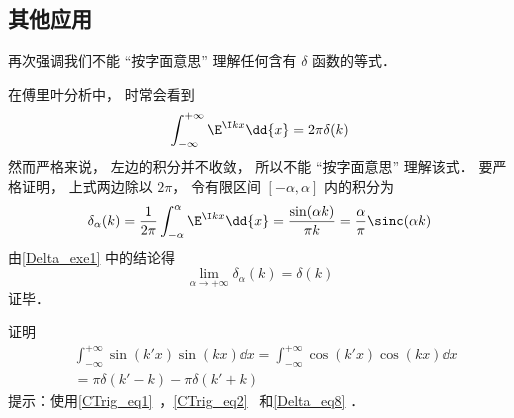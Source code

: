 \subsection{其他应用}
再次强调我们不能 “按字面意思” 理解任何含有 $\delta$ 函数的等式．
\begin{example}{}\label{Delta_ex1}
在傅里叶分析中， 时常会看到
\begin{equation}\label{Delta_eq8}
\int_{-\infty}^{+\infty} \E^{\I kx}\dd{x} = 2\pi \delta(k)
\end{equation}
然而严格来说， 左边的积分并不收敛， 所以不能 “按字面意思” 理解该式． 要严格证明， 上式两边除以 $2\pi$， 令有限区间 $[-\alpha,\alpha]$ 内的积分为
\begin{equation}
\delta_\alpha(k) = \frac{1}{2\pi}\int_{-\alpha}^{\alpha} \E^{\I kx}\dd{x} = \frac{\sin(\alpha k)}{\pi k} = \frac{\alpha}{\pi} \sinc(\alpha k)
\end{equation}
由\autoref{Delta_exe1} 中的结论得
\begin{equation}
\lim_{\alpha\to+\infty} \delta_\alpha(k) = \delta(k)
\end{equation}
证毕．
\end{example}

\begin{exercise}{}
证明
\begin{equation}\label{Delta_eq9}
\begin{aligned}%
&\int_{-\infty}^{+\infty} \sin(k'x) \sin(kx) \dd{x} = \int_{-\infty}^{+\infty} \cos(k'x) \cos(kx) \dd{x}\\
&= \pi\delta(k' - k) - \pi\delta(k' + k)
\end{aligned}
\end{equation}
提示：使用\autoref{CTrig_eq1}~，\autoref{CTrig_eq2}~ 和\autoref{Delta_eq8} ．
\end{exercise}

